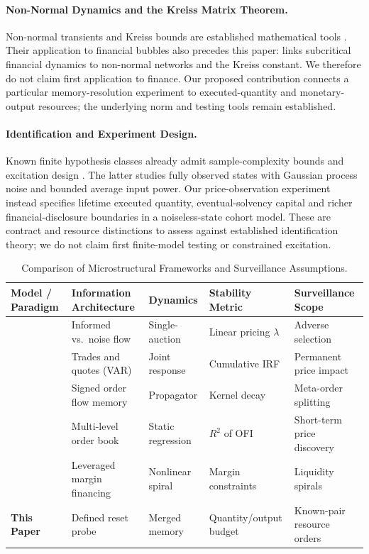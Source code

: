 \documentclass[12pt]{article}
\theoremstyle{definition}
\theoremstyle{remark}
\begin{document}
\paragraph{Non-Normal Dynamics and the Kreiss Matrix Theorem.}
Non-normal transients and Kreiss bounds are established mathematical tools \citep{kreiss1962,spijker1991,trefethen2005spectra}. Their application to financial bubbles also precedes this paper: \citet{sornette2023nonnormal} links subcritical financial dynamics to non-normal networks and the Kreiss constant. We therefore do not claim first application to finance. Our proposed contribution connects a particular memory-resolution experiment to executed-quantity and monetary-output resources; the underlying norm and testing tools remain established.

\paragraph{Identification and Experiment Design.}
Known finite hypothesis classes already admit sample-complexity bounds and excitation design \citep{chatzikiriakos2024finite,chatzikiriakos2026active}. The latter studies fully observed states with Gaussian process noise and bounded average input power. Our price-observation experiment instead specifies lifetime executed quantity, eventual-solvency capital and richer financial-disclosure boundaries in a noiseless-state cohort model. These are contract and resource distinctions to assess against established identification theory; we do not claim first finite-model testing or constrained excitation.

\begin{table}[htbp]
\centering\footnotesize
\caption{Comparison of Microstructural Frameworks and Surveillance Assumptions.}
\label{tab:lit_comparison}
\begin{tabularx}{\textwidth}{p{3.2cm}Xp{2.2cm}XX}\toprule
Model / Paradigm & Information Architecture & Dynamics & Stability Metric & Surveillance Scope \\\midrule
\citet{kyle1985continuous} & Informed vs.\ noise flow & Single-auction & Linear pricing $\lambda$ & Adverse selection \\
\citet{hasbrouck1991} & Trades and quotes (VAR) & Joint response & Cumulative IRF & Permanent price impact \\
\citet{bouchaud2004fluctuations} & Signed order flow memory & Propagator & Kernel decay & Meta-order splitting \\
\citet{cont2014} & Multi-level order book & Static regression & $R^2$ of OFI & Short-term price discovery \\
\citet{brunnermeier2009} & Leveraged margin financing & Nonlinear spiral & Margin constraints & Liquidity spirals \\
\textbf{This Paper} & Defined reset probe & Merged memory & Quantity/output budget & Known-pair resource orders \\\bottomrule
\end{tabularx}
\end{table}
\end{document}
